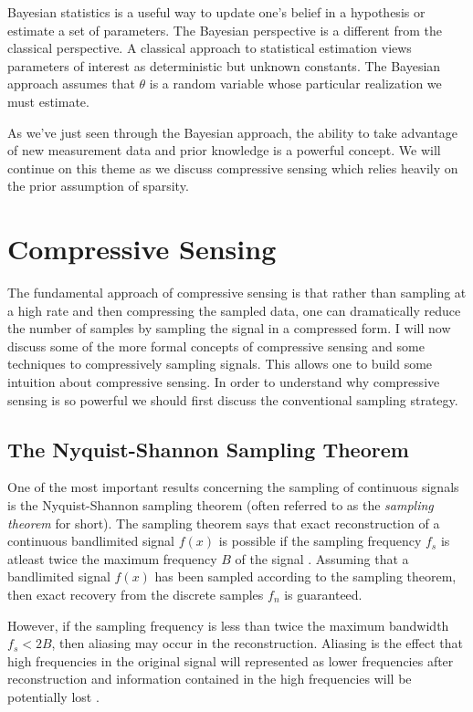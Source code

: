 Bayesian statistics is a useful way to update one's belief in a hypothesis or estimate a set of parameters. The Bayesian perspective is a different from the classical perspective. A classical approach to statistical estimation views parameters of interest as deterministic but unknown constants. The Bayesian approach assumes that $\theta$ is a random variable whose particular realization we must estimate.

As we've just seen through the Bayesian approach, the ability to take advantage of new measurement data and prior knowledge is a powerful concept. We will continue on this theme as we discuss \gls{compressive sensing} which relies heavily on the prior assumption of \gls{sparsity}.

\section{Compressive Sensing}

The fundamental approach of \gls{compressive sensing} is that rather than sampling at a high rate and then compressing the sampled data, one can dramatically reduce the number of samples by sampling the signal in a compressed form. I will now discuss some of the more formal concepts of compressive sensing and some techniques to compressively sampling signals. This allows one to build some intuition about compressive sensing. In order to understand why compressive sensing is so powerful we should first discuss the conventional sampling strategy.


\subsection{The Nyquist-Shannon Sampling Theorem}

One of the most important results concerning the \gls{sampling} of continuous signals is the Nyquist-Shannon sampling theorem (often referred to as the \emph{sampling theorem} for short). The sampling theorem says that exact reconstruction of a continuous \gls{bandlimited signal} $f(x)$ is possible if the sampling frequency $f_s$ is atleast twice the maximum frequency $ B $ of the signal \cite{shannon1949communication}. Assuming that a bandlimited signal $f(x)$ has been sampled according to the sampling theorem, then exact recovery from the discrete samples $f_n$ is guaranteed.

However, if the sampling frequency is less than twice the maximum bandwidth $f_s < 2B$, then aliasing may occur in the reconstruction. Aliasing is the effect that high frequencies in the original signal will represented as lower frequencies after reconstruction and information contained in the high frequencies will be potentially lost \cite{proakis1988introduction}. 


